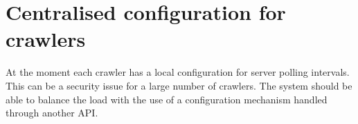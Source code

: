     \section{Centralised configuration for crawlers}
        At the moment each crawler has a local configuration for server
        polling intervals. This can be a security issue for a large number of
        crawlers. The system should be able to balance the load with the use
        of a configuration mechanism handled through another API.

